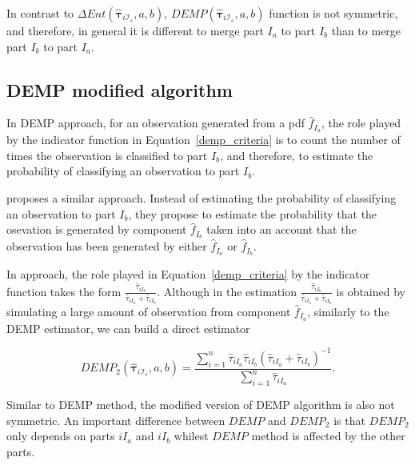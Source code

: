 \documentclass[10pt, a4paper]{article}
\newcommand{\m}[1]{\boldsymbol{#1}}
\begin{document}
In contrast to $\Delta Ent(\hat{\m \tau}_{i \mathcal{I}_s}, a, b)$, $DEMP(\hat{\m \tau}_{i \mathcal{I}_s}, a, b)$ function is not symmetric, and therefore, in general it is different to merge part $I_a$ to part $I_b$ than to merge part $I_b$ to part $I_a$. 

\subsection*{DEMP modified algorithm}

In DEMP approach, for an observation generated from a pdf $\hat{f}_{I_a}$, the role played by the indicator function in Equation~\ref{demp_criteria} is to count the number of times the observation is classified to part $I_b$, and therefore, to estimate the probability of classifying an observation to part $I_b$.

\cite{longford2014} proposes a similar approach. Instead of estimating the probability of classifying an observation to part $I_b$, they propose to estimate the probability that the osevation is generated by component $\hat{f}_{I_b}$ taken into an account that the observation has been generated by either $\hat{f}_{I_a}$ or $\hat{f}_{I_b}$. 

In \cite{longford2014} approach, the role played in Equation~\ref{demp_criteria} by the indicator function takes the form $\frac{\hat{\tau}_{iI_b}}{\hat{\tau}_{iI_a} + \hat{\tau}_{iI_b}}$. Although in  \cite{longford2014} the estimation $\frac{\hat{\tau}_{iI_b}}{\hat{\tau}_{iI_a} + \hat{\tau}_{iI_b}}$ is obtained by simulating a large amount of observation from component $\hat{f}_{I_a}$, similarly to the DEMP estimator, we can build a direct estimator

\begin{equation}\label{demp_criteria}
DEMP_2(\hat{\m \tau}_{i \mathcal{I}_s}, a, b) =\frac{ \sum_{i=1}^n \hat{\tau}_{iI_a} \hat{\tau}_{iI_b}(\hat{\tau}_{iI_a} + \hat{\tau}_{iI_b})^{-1}  }{\sum_{i=1}^n \hat{\tau}_{iI_a} }.
\end{equation}

Similar to DEMP method, the modified version of DEMP algorithm is also not symmetric. An important difference between $DEMP$ and $DEMP_2$ is that $DEMP_2$ only depends on parts  $iI_a$ and $iI_b$ whilest $DEMP$ method is affected by the other parts.

%
%
%
%
%
\end{document}
